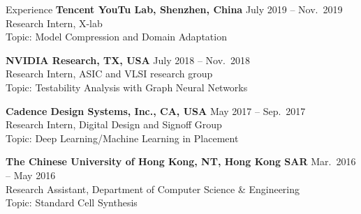 
\begin{rSection}{Experience}
{\bf Tencent YouTu Lab, Shenzhen, China}         \hfill { July 2019 -- Nov.~2019} \\
Research Intern, X-lab\\
Topic: Model Compression and Domain Adaptation
    
{\bf NVIDIA Research, TX, USA}               \hfill { July 2018 -- Nov.~2018} \\
Research Intern, ASIC and VLSI research group\\
Topic: Testability Analysis with Graph Neural Networks

{\bf Cadence Design Systems, Inc., CA, USA}               \hfill { May 2017 -- Sep.~2017} \\
Research Intern, Digital Design and Signoff Group\\
Topic: Deep Learning/Machine Learning in Placement

{\bf The Chinese University of Hong Kong, NT, Hong Kong SAR}  \hfill { Mar.~2016 -- May 2016} \\ 
Research Assistant, Department of Computer Science \& Engineering \\
Topic: Standard Cell Synthesis

\end{rSection}


